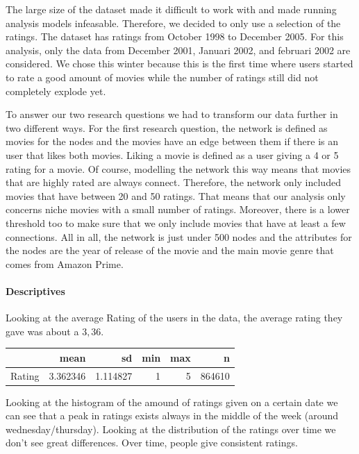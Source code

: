 \documentclass[
  english,
  man,floatsintext]{apa6}
\let\oldparagraph\paragraph
\renewcommand{\paragraph}[1]{\oldparagraph{#1}\mbox{}}
\begin{document}
The large size of the dataset made it difficult to work with and made running analysis models infeasable.
Therefore, we decided to only use a selection of the ratings. The dataset has ratings from October 1998 to December 2005.
For this analysis, only the data from December 2001, Januari 2002, and februari 2002 are considered.
We chose this winter because this is the first time where users started to rate a good amount of movies while the number of ratings still did not completely explode yet.

To answer our two research questions we had to transform our data further in two different ways.
For the first research question, the network is defined as movies for the nodes and the movies have an edge between them if there is an user that likes both movies.
Liking a movie is defined as a user giving a 4 or 5 rating for a movie.
Of course, modelling the network this way means that movies that are highly rated are always connect.
Therefore, the network only included movies that have between 20 and 50 ratings.
That means that our analysis only concerns niche movies with a small number of ratings.
Moreover, there is a lower threshold too to make sure that we only include movies that have at least a few connections.
All in all, the network is just under 500 nodes and the attributes for the nodes are the year of release of the movie and the main movie genre that comes from Amazon Prime.

\hypertarget{descriptives}{%
\paragraph{Descriptives}\label{descriptives}}

Looking at the average Rating of the users in the data, the average rating they gave was about a \(3,36\).

\begin{table}
\centering
\begin{tabular}{l|r|r|r|r|r}
\hline
  & mean & sd & min & max & n\\
\hline
Rating & 3.362346 & 1.114827 & 1 & 5 & 864610\\
\hline
\end{tabular}
\end{table}

Looking at the histogram of the amound of ratings given on a certain date we can see that a peak in ratings exists always in the middle of the week (around wednesday/thursday). Looking at the distribution of the ratings over time we don't see great differences. Over time, people give consistent ratings.
\end{document}

